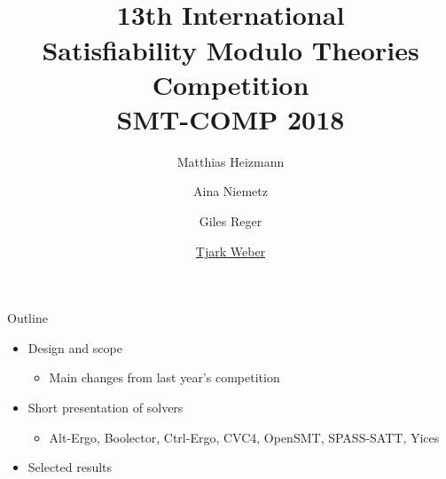 \documentclass{beamer}
\title[SMT-COMP 2018]{${}$\\[3.5em]13th International\\
Satisfiability Modulo Theories\\
Competition\\[.7em]
SMT-COMP 2018\\[3em]}
\author{Matthias Heizmann \and Aina Niemetz\\ \and Giles Reger \and
  \underline{Tjark Weber}}
\institute{}
\date{}
\begin{document}

\frame{\titlepage}
\logo{}


\section{}%
\subsection{}%


\begin{frame}{Outline}
  \begin{itemize}
  \item Design and scope

    \smallskip

    \begin{itemize}
    \item Main changes from last year's competition
    \end{itemize}

    \vfill

  \item Short presentation of solvers

    \smallskip

    \begin{itemize}
    \item Alt-Ergo, Boolector, Ctrl-Ergo, CVC4, OpenSMT, SPASS-SATT,
      Yices
    \end{itemize}

    \vfill

  \item Selected results
  \end{itemize}
\end{frame}


\begin{frame}{}
  \begin{center}
    \vfill
      {\huge {}}
    \vfill
  \end{center}
\end{frame}
\end{document}
